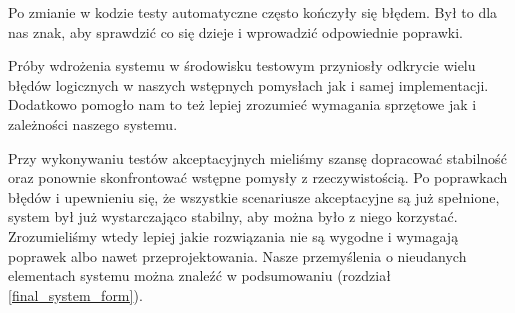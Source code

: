 \documentclass[../analiza-rozwiazania.tex]{subfiles}
\begin{document}
Po zmianie w kodzie testy automatyczne często kończyły się błędem.
Był to dla nas znak, aby sprawdzić co się dzieje i wprowadzić odpowiednie poprawki.

Próby wdrożenia systemu w środowisku testowym przyniosły odkrycie wielu błędów logicznych w naszych wstępnych pomysłach jak i samej implementacji.
Dodatkowo pomogło nam to też lepiej zrozumieć wymagania sprzętowe jak i zależności naszego systemu.

Przy wykonywaniu testów akceptacyjnych mieliśmy szansę dopracować stabilność oraz ponownie skonfrontować wstępne pomysły z rzeczywistością.
Po poprawkach błędów i upewnieniu się, że wszystkie scenariusze akceptacyjne są już spełnione, system był już wystarczająco stabilny, aby można było z niego korzystać.
Zrozumieliśmy wtedy lepiej jakie rozwiązania nie są wygodne i wymagają poprawek albo nawet przeprojektowania.
Nasze przemyślenia o nieudanych elementach systemu można znaleźć w podsumowaniu (rozdział \ref{final_system_form}).
\end{document}
